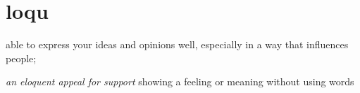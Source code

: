 \chapter{loqu}

\begin{vocabulary}
    able to express your ideas and opinions well, especially in a way that influences people;

\textit{an eloquent appeal for support}
showing a feeling or meaning without using words
\end{vocabulary}

\begin{vocabulary}[loquacious]
\end{vocabulary}